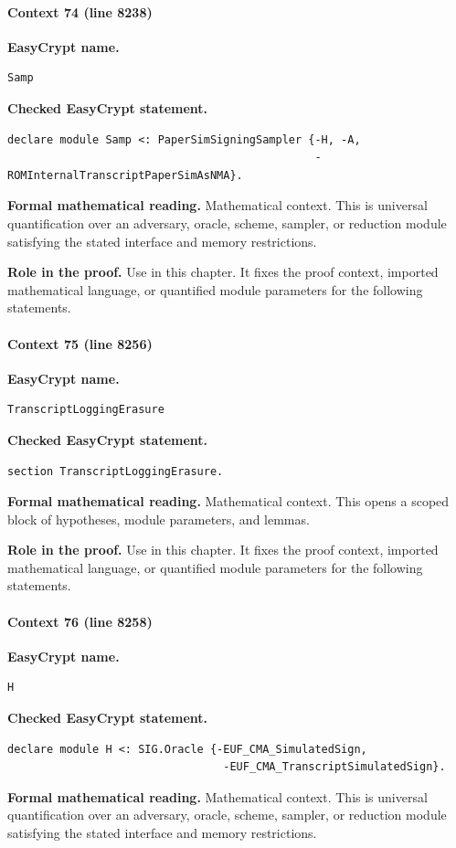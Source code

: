 \paragraph{Context 74 (line 8238)}
\noindent\textbf{EasyCrypt name.}
\begin{lstlisting}[language=EasyCrypt,basicstyle=\ttfamily\scriptsize]
Samp
\end{lstlisting}
\noindent\textbf{Checked EasyCrypt statement.}
\begin{lstlisting}[language=EasyCrypt,basicstyle=\ttfamily\scriptsize]
declare module Samp <: PaperSimSigningSampler {-H, -A,
                                               -ROMInternalTranscriptPaperSimAsNMA}.
\end{lstlisting}
\noindent\textbf{Formal mathematical reading.}
Mathematical context. This is universal quantification over an adversary, oracle, scheme, sampler, or reduction module satisfying the stated interface and memory restrictions.

\noindent\textbf{Role in the proof.}
Use in this chapter. It fixes the proof context, imported mathematical language, or quantified module parameters for the following statements.

\paragraph{Context 75 (line 8256)}
\noindent\textbf{EasyCrypt name.}
\begin{lstlisting}[language=EasyCrypt,basicstyle=\ttfamily\scriptsize]
TranscriptLoggingErasure
\end{lstlisting}
\noindent\textbf{Checked EasyCrypt statement.}
\begin{lstlisting}[language=EasyCrypt,basicstyle=\ttfamily\scriptsize]
section TranscriptLoggingErasure.
\end{lstlisting}
\noindent\textbf{Formal mathematical reading.}
Mathematical context. This opens a scoped block of hypotheses, module parameters, and lemmas.

\noindent\textbf{Role in the proof.}
Use in this chapter. It fixes the proof context, imported mathematical language, or quantified module parameters for the following statements.

\paragraph{Context 76 (line 8258)}
\noindent\textbf{EasyCrypt name.}
\begin{lstlisting}[language=EasyCrypt,basicstyle=\ttfamily\scriptsize]
H
\end{lstlisting}
\noindent\textbf{Checked EasyCrypt statement.}
\begin{lstlisting}[language=EasyCrypt,basicstyle=\ttfamily\scriptsize]
declare module H <: SIG.Oracle {-EUF_CMA_SimulatedSign,
                                 -EUF_CMA_TranscriptSimulatedSign}.
\end{lstlisting}
\noindent\textbf{Formal mathematical reading.}
Mathematical context. This is universal quantification over an adversary, oracle, scheme, sampler, or reduction module satisfying the stated interface and memory restrictions.

